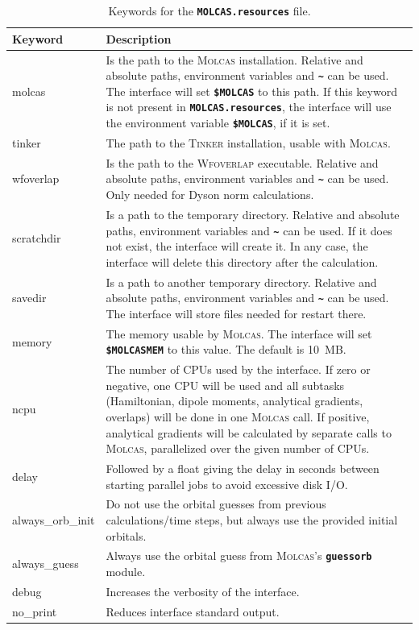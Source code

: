 \documentclass[a4paper,10pt,DIV=15,openany,twoside=false]{scrbook}
\newcommand{\ttt}[1]{\textbf{\texttt{#1}}}
\begin{document}
\begin{table}
  \centering
  \caption{Keywords for the \ttt{MOLCAS.resources} file.}
  \label{tab:molcas_sh2}
  \begin{tabular}{>{\ttfamily}lp{12cm}}
  \toprule
  Keyword       &Description\\
  \midrule
molcas          &Is the path to the \textsc{Molcas} installation. Relative and absolute paths, environment variables and \ttt{\textasciitilde} can be used. The interface will set \ttt{\$MOLCAS} to this path. If this keyword is not present in \ttt{MOLCAS.resources}, the interface will use the environment variable \ttt{\$MOLCAS}, if it is set.\\
tinker          &The path to the \textsc{Tinker} installation, usable with \textsc{Molcas}.\\
wfoverlap       &Is the path to the \textsc{Wfoverlap} executable. Relative and absolute paths, environment variables and \ttt{\textasciitilde} can be used. Only needed for Dyson norm calculations.\\
scratchdir      &Is a path to the temporary directory. Relative and absolute paths, environment variables and \ttt{\textasciitilde} can be used. If it does not exist, the interface will create it. In any case, the interface will delete this directory after the calculation.\\
savedir         &Is a path to another temporary directory.  Relative and absolute paths, environment variables and \ttt{\textasciitilde} can be used. The interface will store files needed for restart there.\\
memory          &The memory usable by \textsc{Molcas}. The interface will set \ttt{\$MOLCASMEM} to this value. The default is 10~MB.\\
ncpu            &The number of CPUs used by the interface. If zero or negative, one CPU will be used and all subtasks (Hamiltonian, dipole moments, analytical gradients, overlaps) will be done in one \textsc{Molcas} call. If positive, analytical gradients will be calculated by separate calls to \textsc{Molcas}, parallelized over the given number of CPUs. \\
delay           &Followed by a float giving the delay in seconds between starting parallel jobs to avoid excessive disk I/O.\\
always\_orb\_init &Do not use the orbital guesses from previous calculations/time steps, but always use the provided initial orbitals.\\
always\_guess   &Always use the orbital guess from \textsc{Molcas}'s \ttt{guessorb} module.\\
  debug           &Increases the verbosity of the interface.\\
  no\_print       &Reduces interface standard output.\\
  \bottomrule
  \end{tabular}
\end{table}
\end{document}

